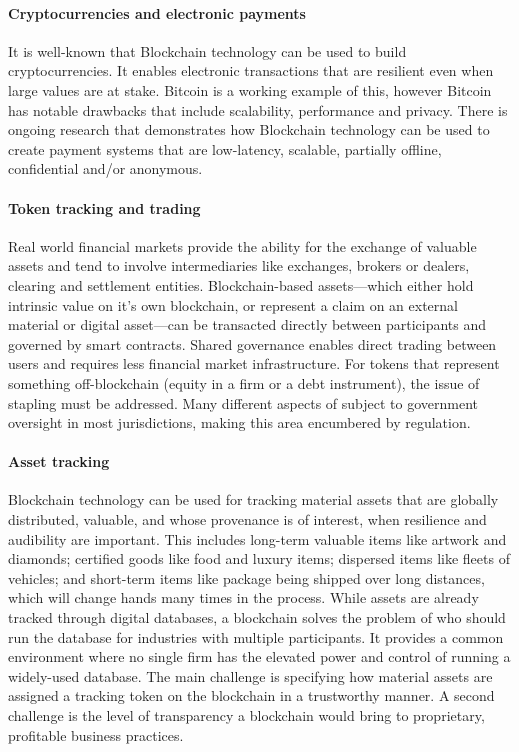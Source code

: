 \paragraph{Cryptocurrencies and electronic payments}
It is well-known that Blockchain technology can be used to build cryptocurrencies. 
It enables electronic transactions that are resilient even when large values are at stake.
Bitcoin is a working example of this, however Bitcoin has notable drawbacks that include scalability, performance and privacy.
There is ongoing research that demonstrates how Blockchain technology can be used to create payment systems that are low-latency, scalable, partially offline, confidential and/or anonymous.

\paragraph{Token tracking and trading}
Real world financial markets provide the ability for the exchange of valuable assets and tend to involve intermediaries like exchanges, brokers or dealers, clearing and settlement entities. 
Blockchain-based assets---which either hold intrinsic value on it's own blockchain, or represent a claim on an external material or digital asset---can be transacted directly between participants and governed by smart contracts.
Shared governance enables direct trading between users and requires less financial market infrastructure.
For tokens that represent something off-blockchain (\ie equity in a firm or a debt instrument), the issue of stapling must be addressed.
Many different aspects of subject to government oversight in most jurisdictions, making this area encumbered by regulation.

\paragraph{Asset tracking} 
Blockchain technology can be used for tracking material assets that are globally distributed, valuable, and whose provenance is of interest, when resilience and audibility are important. This includes long-term valuable items like artwork and diamonds; certified goods like food and luxury items; dispersed items like fleets of vehicles; and short-term items like package being shipped over long distances, which will change hands many times in the process. While assets are already tracked through digital databases, a blockchain solves the problem of who should run the database for industries with multiple participants. It provides a common environment where no single firm has the elevated power and control of running a widely-used database. The main challenge is specifying how material assets are assigned a tracking token on the blockchain in a trustworthy manner. A second challenge is the level of transparency a blockchain would bring to proprietary, profitable business practices.

